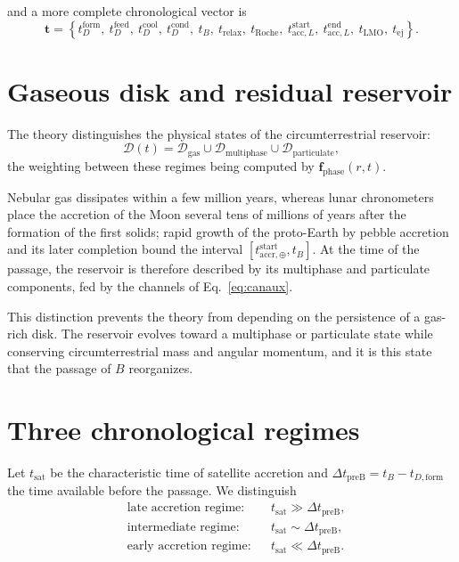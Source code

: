 \documentclass[11pt,a4paper,openany]{report}
\begin{document}
and a more complete chronological vector is
\begin{equation}
\mathbf{t}=\left\{t^{\mathrm{form}}_D,\ t^{\mathrm{feed}}_D,\ t^{\mathrm{cool}}_D,\
t^{\mathrm{cond}}_D,\ t_B,\ t_{\mathrm{relax}},\ t_{\mathrm{Roche}},\
t^{\mathrm{start}}_{\mathrm{acc},L},\ t^{\mathrm{end}}_{\mathrm{acc},L},\ t_{\mathrm{LMO}},\ t_{\mathrm{ej}}\right\}.
\label{eq:vecteur-t}
\end{equation}

\section{Gaseous disk and residual reservoir}

The theory distinguishes the physical states of the circumterrestrial reservoir:
\begin{equation}
\mathcal{D}(t)=\mathcal{D}_{\mathrm{gas}}\cup\mathcal{D}_{\mathrm{multiphase}}\cup
\mathcal{D}_{\mathrm{particulate}},
\label{eq:etats}
\end{equation}
the weighting between these regimes being computed by $\mathbf{f}_{\mathrm{phase}}(r,t)$.

Nebular gas dissipates within a few million years, whereas lunar chronometers place the accretion
of the Moon several tens of millions of years after the formation of the first solids; rapid
growth of the proto-Earth by pebble accretion \cite{Johansen2021} and its later completion bound
the interval $[t^{\mathrm{start}}_{\mathrm{accr},\oplus},t_B]$. At the time of the passage, the
reservoir is therefore described by its multiphase and particulate components, fed by the channels
of Eq.~\eqref{eq:canaux}.

\begin{lecture}
This distinction prevents the theory from depending on the persistence of a gas-rich disk. The
reservoir evolves toward a multiphase or particulate state while conserving circumterrestrial mass
and angular momentum, and it is this state that the passage of $B$ reorganizes.
\end{lecture}


\section{Three chronological regimes}
\label{sec:regimes}

Let $t_{\mathrm{sat}}$ be the characteristic time of satellite accretion and
$\Delta t_{\mathrm{preB}}=t_B-t_{D,\mathrm{form}}$ the time available before the passage. We distinguish
\begin{align}
&\text{late accretion regime:} && t_{\mathrm{sat}}\gg\Delta t_{\mathrm{preB}},
\label{eq:tardif}\\
&\text{intermediate regime:} && t_{\mathrm{sat}}\sim\Delta t_{\mathrm{preB}},
\label{eq:interm}\\
&\text{early accretion regime:} && t_{\mathrm{sat}}\ll\Delta t_{\mathrm{preB}}.
\label{eq:precoce}
\end{align}
\end{document}
